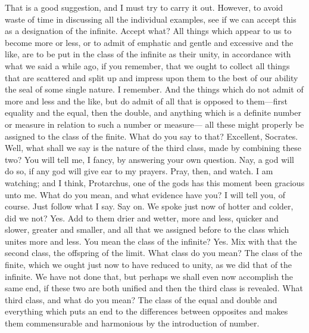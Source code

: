 \documentclass[letterpaper,12pt]{article}
\newcommand{\stephpag}[1]{\marginnote{\small\itshape\fontfamily{ppl}\selectfont #1}}
\begin{document}
\begin{drama}
\socratesspeaks
That is a good suggestion, and I must try to carry it out. However, to avoid waste of time in discussing all the individual examples, see if we can accept this as a designation of the infinite.
\protarchusspeaks
Accept what?
\socratesspeaks
All things which appear to us to become more or less, or to admit of emphatic and gentle \stephpag{25 a} and excessive and the like, are to be put in the class of the infinite as their unity, in accordance with what we said a while ago, if you remember, that we ought to collect all things that are scattered and split up and impress upon them to the best of our ability the seal of some single nature.
\protarchusspeaks
I remember.
\socratesspeaks
And the things which do not admit of more and less and the like, but do admit of all that is opposed to them---first equality and the equal, then the double, and anything which is a definite number or measure in relation to such a number or measure--- \stephpag{b} all these might properly be assigned to the class of the finite. What do you say to that?
\protarchusspeaks
Excellent, Socrates.
\socratesspeaks
Well, what shall we say is the nature of the third class, made by combining these two?
\protarchusspeaks
You will tell me, I fancy, by answering your own question.
\socratesspeaks
Nay, a god will do so, if any god will give ear to my prayers.
\protarchusspeaks
Pray, then, and watch.
\socratesspeaks
I am watching; and I think, Protarchus, one of the gods has this moment been gracious unto me. \stephpag{c}
\protarchusspeaks
What do you mean, and what evidence have you?
\socratesspeaks
I will tell you, of course. Just follow what I say.
\protarchusspeaks
Say on.
\socratesspeaks
We spoke just now of hotter and colder, did we not?
\protarchusspeaks
Yes.
\socratesspeaks
Add to them drier and wetter, more and less, quicker and slower, greater and smaller, and all that we assigned before to the class which unites more and less. \stephpag{d}
\protarchusspeaks
You mean the class of the infinite?
\socratesspeaks
Yes. Mix with that the second class, the offspring of the limit.
\protarchusspeaks
What class do you mean?
\socratesspeaks
The class of the finite, which we ought just now to have reduced to unity, as we did that of the infinite. We have not done that, but perhaps we shall even now accomplish the same end, if these two are both unified and then the third class is revealed.
\protarchusspeaks
What third class, and what do you mean?
\socratesspeaks
The class of the equal and double and everything which puts an end \stephpag{e} to the differences between opposites and makes them commensurable and harmonious by the introduction of number.

\end{drama}
\end{document}

